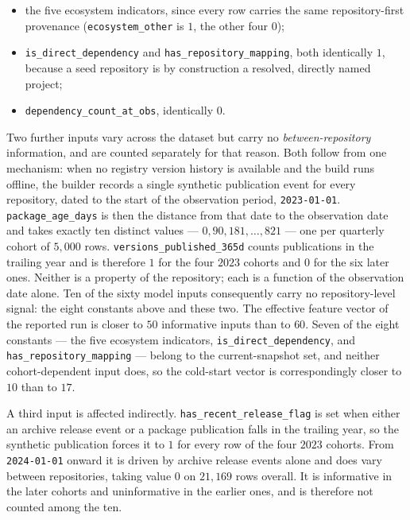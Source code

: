\begin{itemize}
  \item the five ecosystem indicators, since every row carries the same repository-first provenance (\texttt{ecosystem\_other} is \(1\), the other four \(0\));
  \item \texttt{is\_direct\_dependency} and \texttt{has\_repository\_mapping}, both identically \(1\), because a seed repository is by construction a resolved, directly named project;
  \item \texttt{dependency\_count\_at\_obs}, identically \(0\).
\end{itemize}

Two further inputs vary across the dataset but carry no \emph{between-repository} information, and are counted separately for that reason. Both follow from one mechanism: when no registry version history is available and the build runs offline, the builder records a single synthetic publication event for every repository, dated to the start of the observation period, \texttt{2023-01-01}. \texttt{package\_age\_days} is then the distance from that date to the observation date and takes exactly ten distinct values --- \(0, 90, 181, \dots, 821\) --- one per quarterly cohort of \(5{,}000\) rows. \texttt{versions\_published\_365d} counts publications in the trailing year and is therefore \(1\) for the four \(2023\) cohorts and \(0\) for the six later ones. Neither is a property of the repository; each is a function of the observation date alone. Ten of the sixty model inputs consequently carry no repository-level signal: the eight constants above and these two. The effective feature vector of the reported run is closer to \(50\) informative inputs than to \(60\). Seven of the eight constants --- the five ecosystem indicators, \texttt{is\_direct\_dependency}, and \texttt{has\_repository\_mapping} --- belong to the current-snapshot set, and neither cohort-dependent input does, so the cold-start vector is correspondingly closer to \(10\) than to \(17\).

A third input is affected indirectly. \texttt{has\_recent\_release\_flag} is set when either an archive release event or a package publication falls in the trailing year, so the synthetic publication forces it to \(1\) for every row of the four \(2023\) cohorts. From \texttt{2024-01-01} onward it is driven by archive release events alone and does vary between repositories, taking value \(0\) on \(21{,}169\) rows overall. It is informative in the later cohorts and uninformative in the earlier ones, and is therefore not counted among the ten.

